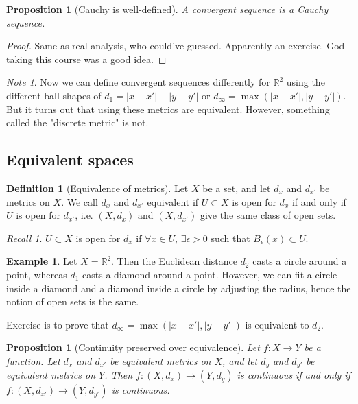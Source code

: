 \documentclass{article}
\theoremstyle{definition}
\newtheorem{defn}{Definition}[section]
\newtheorem{exmp}{Example}[section]
\theoremstyle{plain}%
\newtheorem{prop}[thm]{Proposition}
\theoremstyle{remark}
\newtheorem*{note}{Note}
\newtheorem*{rec}{Recall}
\newcommand{\R}{\mathbb{R}}
\begin{document}
\begin{prop}[Cauchy is well-defined]
A convergent sequence is a Cauchy sequence.
\end{prop}

\begin{proof}
Same as real analysis, who could've guessed. Apparently an exercise. God taking this course was a good idea.
\end{proof}

\begin{note}
Now we can define convergent sequences differently for $\R^2$ using the different ball shapes of $d_1 = |x-x'| + |y-y'|$ or $d_{\infty} = \max(|x-x'|, |y-y'|)$. But it turns out that using these metrics are equivalent. However, something called the "discrete metric" is not.
\end{note}

\subsection{Equivalent spaces}

\begin{defn}[Equivalence of metrics]
Let $X$ be a set, and let $d_x$ and $d_{x'}$ be metrics on $X$. We call $d_x$ and $d_{x'}$ equivalent if $U \subset X$ is open for $d_x$ if and only if $U$ is open for $d_{x'}$, i.e. $(X,d_x)$ and $(X, d_{x'})$ give the same class of open sets.
\end{defn}

\begin{rec}
$U \subset X$ is open for $d_x$ if $\forall x \in U$, $\exists \epsilon > 0$ such that $B_{\epsilon}(x) \subset U$.
\end{rec}

\begin{exmp}
Let $X = \R^2$. Then the Euclidean distance $d_2$ casts a circle around a point, whereas $d_1$ casts a diamond around a point. However, we can fit a circle inside a diamond and a diamond inside a circle by adjusting the radius, hence the notion of open sets is the same.

Exercise is to prove that $d_{\infty} = \max(|x-x'|, |y-y'|)$ is equivalent to $d_2$.
\end{exmp}

\begin{prop}[Continuity preserved over equivalence]
Let $f : X \to Y$ be a function. Let $d_x$ and $d_{x'}$ be equivalent metrics on $X$, and let $d_y$ and $d_{y'}$ be equivalent metrics on $Y$. Then $f: (X,d_x) \to (Y,d_y)$ is continuous if and only if $f: (X, d_{x'}) \to (Y, d_{y'})$ is continuous.
\end{prop}
\end{document}
